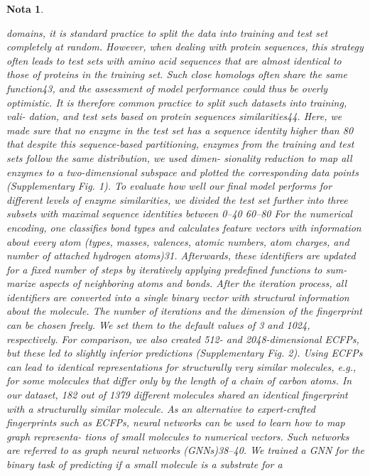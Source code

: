 \documentclass[12pt]{article}
\newtheorem{Note}{Nota}%
\begin{document}
\begin{Note}
\begin{itemize}
domains, it is standard practice to split the data into training and test
set completely at random. However, when dealing with protein
sequences, this strategy often leads to test sets with amino acid
sequences that are almost identical to those of proteins in the training
set. Such close homologs often share the same function43, and the
assessment of model performance could thus be overly optimistic. It is
therefore common practice to split such datasets into training, vali-
dation, and test sets based on protein sequences similarities44. Here,
we made sure that no enzyme in the test set has a sequence identity
higher than 80%
that despite this sequence-based partitioning, enzymes from the
training and test sets follow the same distribution, we used dimen-
sionality reduction to map all enzymes to a two-dimensional subspace
and plotted the corresponding data points (Supplementary Fig. 1). To
evaluate how well our ﬁnal model performs for different levels of
enzyme similarities, we divided the test set further into three subsets
with maximal sequence identities between 0–40%
60–80%
For the numerical encoding, one classiﬁes bond types and calculates
feature vectors with information about every atom (types, masses,
valences, atomic numbers, atom charges, and number of attached
hydrogen atoms)31. Afterwards, these identiﬁers are updated for a ﬁxed
number of steps by iteratively applying predeﬁned functions to sum-
marize aspects of neighboring atoms and bonds. After the iteration
process, all identiﬁers are converted into a single binary vector with
structural information about the molecule. The number of iterations
and the dimension of the ﬁngerprint can be chosen freely. We set them
to the default values of 3 and 1024, respectively. For comparison, we
also created 512- and 2048-dimensional ECFPs, but these led to slightly
inferior predictions (Supplementary Fig. 2). Using ECFPs can lead to
identical representations for structurally very similar molecules, e.g.,
for some molecules that differ only by the length of a chain of carbon
atoms. In our dataset, 182 out of 1379 different molecules shared an
identical ﬁngerprint with a structurally similar molecule.
As an alternative to expert-crafted ﬁngerprints such as ECFPs,
neural networks can be used to learn how to map graph representa-
tions of small molecules to numerical vectors. Such networks are
referred to as graph neural networks (GNNs)38–40. We trained a GNN for
the binary task of predicting if a small molecule is a substrate for a

\end{itemize}
\end{Note}
\end{document}
